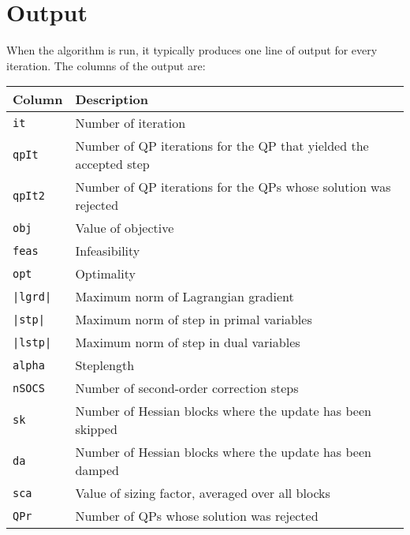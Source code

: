 \documentclass[	11pt,
				a4paper,
				abstract=true,
				twoside=true,
				bibliography=totoc, 
				headinclude=true,
				footinclude=false]{scrartcl}
\begin{document}
\section{Output}
When the algorithm is run, it typically produces one line of output for every iteration. The columns of the output are:

\begin{tabular}[c]{ll}
Column & Description\\\hline\hline
\texttt{it}		&	Number of iteration \\\hline
\texttt{qpIt}	&	Number of QP iterations for the QP that yielded the accepted step \\\hline
\texttt{qpIt2}	&	Number of QP iterations for the QPs whose solution was rejected \\\hline
\texttt{obj}	&	Value of objective \\\hline
\texttt{feas}	&	Infeasibility \\\hline
\texttt{opt}	&	Optimality \\\hline
\texttt{|lgrd|}	&	Maximum norm of Lagrangian gradient \\\hline
\texttt{|stp|}	&	Maximum norm of step in primal variables \\\hline
\texttt{|lstp|}	&	Maximum norm of step in dual variables \\\hline
\texttt{alpha}	&	Steplength \\\hline
\texttt{nSOCS}	&	Number of second-order correction steps \\\hline
\texttt{sk}		&	Number of Hessian blocks where the update has been skipped \\\hline
\texttt{da}		&	Number of Hessian blocks where the update has been damped \\\hline
\texttt{sca}	&	Value of sizing factor, averaged over all blocks \\\hline
\texttt{QPr}	&	Number of QPs whose solution was rejected
\\\hline
\end{tabular}




\end{document}
